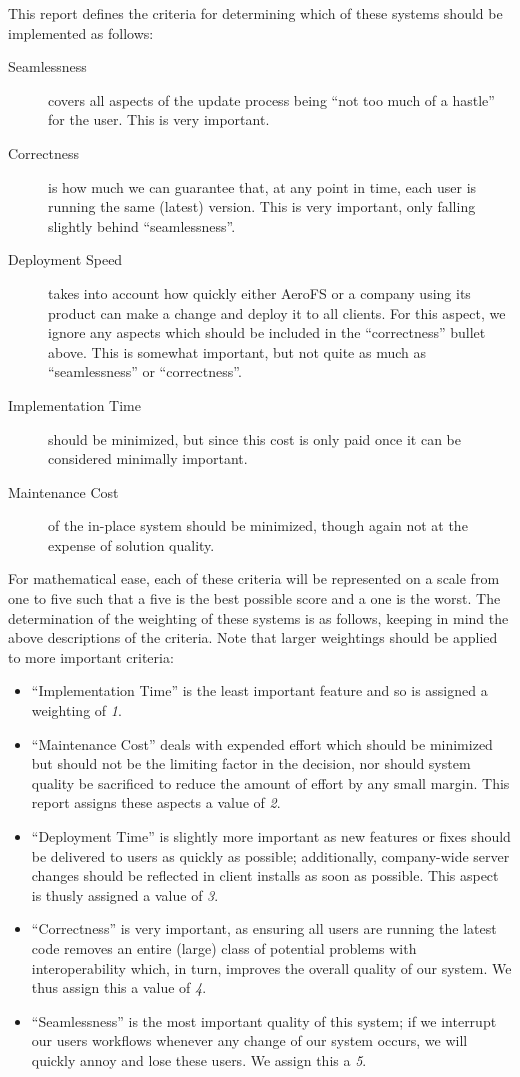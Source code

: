 \documentclass[12pt]{article}
\begin{document}
This report defines the criteria for determining which of these systems should be implemented as follows:
\begin{description}
\item[Seamlessness] covers all aspects of the update process being ``not too much of a hastle'' for the user. This is very important.
\item[Correctness] is how much we can guarantee that, at any point in time, each user is running the same (latest) version. This is very important, only falling slightly behind ``seamlessness''.
\item[Deployment Speed] takes into account how quickly either AeroFS or a company using its product can make a change and deploy it to all clients. For this aspect, we ignore any aspects which should be included in the ``correctness'' bullet above. This is somewhat important, but not quite as much as ``seamlessness'' or ``correctness''.
\item[Implementation Time] should be minimized, but since this cost is only paid once it can be considered minimally important.
\item[Maintenance Cost] of the in-place system should be minimized, though again not at the expense of solution quality.
\end{description}

For mathematical ease, each of these criteria will be represented on a scale from one to five such that a five is the best possible score and a one is the worst. The determination of the weighting of these systems is as follows, keeping in mind the above descriptions of the criteria. Note that larger weightings should be applied to more important criteria:
\begin{itemize}
\item ``Implementation Time'' is the least important feature and so is assigned a weighting of {\it 1}.
\item ``Maintenance Cost'' deals with expended effort which should be minimized but should not be the limiting factor in the decision, nor should system quality be sacrificed to reduce the amount of effort by any small margin. This report assigns these aspects a value of {\it 2}.
\item ``Deployment Time'' is slightly more important as new features or fixes should be delivered to users as quickly as possible; additionally, company-wide server changes should be reflected in client installs as soon as possible. This aspect is thusly assigned a value of {\it 3}.
\item ``Correctness'' is very important, as ensuring all users are running the latest code removes an entire (large) class of potential problems with interoperability which, in turn, improves the overall quality of our system. We thus assign this a value of {\it 4}.
\item ``Seamlessness'' is the most important quality of this system; if we interrupt our users workflows whenever any change of our system occurs, we will quickly annoy and lose these users. We assign this a {\it 5}.
\end{itemize}
\end{document}
